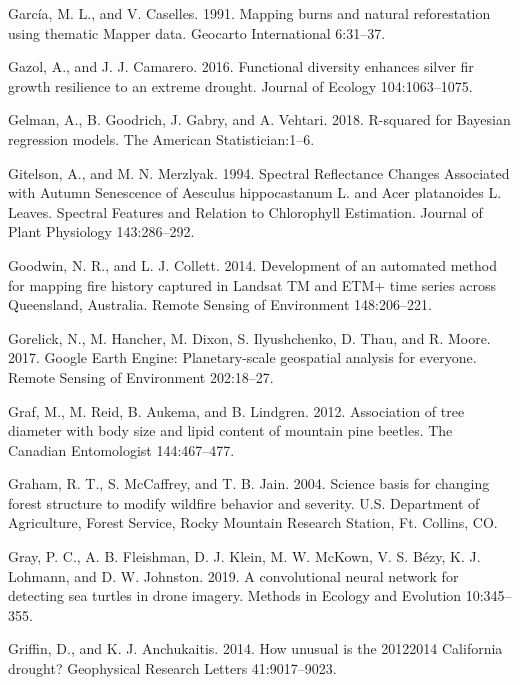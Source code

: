 \documentclass[twoside,12pt,final]{ucthesis-CA2012}
\begin{document}
\begin{ucmainmatter}
\hypertarget{ref-garcia1991}{}
García, M. L., and V. Caselles. 1991. Mapping burns and natural
reforestation using thematic Mapper data. Geocarto International
6:31--37.

\hypertarget{ref-gazol2016}{}
Gazol, A., and J. J. Camarero. 2016. Functional diversity enhances
silver fir growth resilience to an extreme drought. Journal of Ecology
104:1063--1075.

\hypertarget{ref-gelman2018}{}
Gelman, A., B. Goodrich, J. Gabry, and A. Vehtari. 2018. R-squared for
Bayesian regression models. The American Statistician:1--6.

\hypertarget{ref-gitelson1994}{}
Gitelson, A., and M. N. Merzlyak. 1994. Spectral Reflectance Changes
Associated with Autumn Senescence of Aesculus hippocastanum L. and Acer
platanoides L. Leaves. Spectral Features and Relation to Chlorophyll
Estimation. Journal of Plant Physiology 143:286--292.

\hypertarget{ref-goodwin2014}{}
Goodwin, N. R., and L. J. Collett. 2014. Development of an automated
method for mapping fire history captured in Landsat TM and ETM+ time
series across Queensland, Australia. Remote Sensing of Environment
148:206--221.

\hypertarget{ref-gorelick2017}{}
Gorelick, N., M. Hancher, M. Dixon, S. Ilyushchenko, D. Thau, and R.
Moore. 2017. Google Earth Engine: Planetary-scale geospatial analysis
for everyone. Remote Sensing of Environment 202:18--27.

\hypertarget{ref-graf2012}{}
Graf, M., M. Reid, B. Aukema, and B. Lindgren. 2012. Association of tree
diameter with body size and lipid content of mountain pine beetles. The
Canadian Entomologist 144:467--477.

\hypertarget{ref-graham2004}{}
Graham, R. T., S. McCaffrey, and T. B. Jain. 2004. Science basis for
changing forest structure to modify wildfire behavior and severity. U.S.
Department of Agriculture, Forest Service, Rocky Mountain Research
Station, Ft. Collins, CO.

\hypertarget{ref-gray2019}{}
Gray, P. C., A. B. Fleishman, D. J. Klein, M. W. McKown, V. S. Bézy, K.
J. Lohmann, and D. W. Johnston. 2019. A convolutional neural network for
detecting sea turtles in drone imagery. Methods in Ecology and Evolution
10:345--355.

\hypertarget{ref-griffin2014}{}
Griffin, D., and K. J. Anchukaitis. 2014. How unusual is the 20122014
California drought? Geophysical Research Letters 41:9017--9023.


\end{ucmainmatter}
\end{document}
